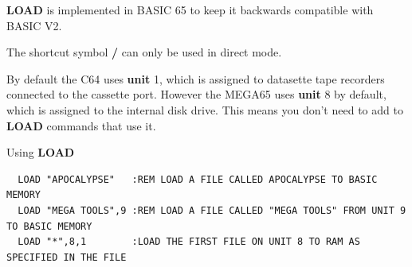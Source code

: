 \begin{description}[leftmargin=2cm,style=nextline]
   {\bf LOAD} is implemented in BASIC 65 to keep it backwards
   compatible with BASIC V2.

   The shortcut symbol {\bf /} can only be used in direct mode.

   By default the C64 uses {\bf unit} 1, which is assigned to datasette
   tape recorders connected to the cassette port. However the MEGA65
   uses {\bf unit} 8 by default, which is assigned to the internal
   disk drive. This means you don't need to add  to
   {\bf LOAD} commands that use it.

\item [Examples:] Using {\bf LOAD}
\begin{tcolorbox}[colback=black,coltext=white]
\verbatimfont{\codefont}
\begin{verbatim}
  LOAD "APOCALYPSE"   :REM LOAD A FILE CALLED APOCALYPSE TO BASIC MEMORY
  LOAD "MEGA TOOLS",9 :REM LOAD A FILE CALLED "MEGA TOOLS" FROM UNIT 9 TO BASIC MEMORY
  LOAD "*",8,1        :LOAD THE FIRST FILE ON UNIT 8 TO RAM AS SPECIFIED IN THE FILE
\end{verbatim}
\end{tcolorbox}
\end{description}


\newpage
